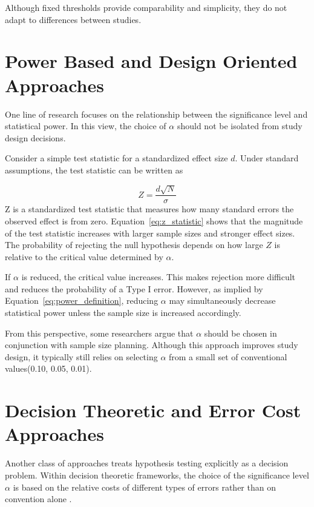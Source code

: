 Although fixed thresholds provide comparability and simplicity, they do not adapt to differences between studies.


\section{Power Based and Design Oriented Approaches}

One line of research focuses on the relationship between the significance level and statistical power. In this view, the choice of $\alpha$ should not be isolated from study design decisions.

Consider a simple test statistic for a standardized effect size $d$. Under standard assumptions, the test statistic can be written as

\begin{equation}
	Z = \frac{d \sqrt{N}}{\sigma}
	\label{eq:z_statistic}
\end{equation}
Z is a standardized test statistic that measures how many standard errors the observed effect is from zero.
Equation~\ref{eq:z_statistic} shows that the magnitude of the test statistic increases with larger sample sizes and stronger effect sizes. The probability of rejecting the null hypothesis depends on how large $Z$ is relative to the critical value determined by $\alpha$\cite{PetersonFoley2021}.

If $\alpha$ is reduced, the critical value increases. This makes rejection more difficult and reduces the probability of a Type I error. However, as implied by Equation~\ref{eq:power_definition}, reducing $\alpha$ may simultaneously decrease statistical power unless the sample size is increased accordingly.

From this perspective, some researchers argue that $\alpha$ should be chosen in conjunction with sample size planning. Although this approach improves study design, it typically still relies on selecting $\alpha$ from a small set of conventional values(0.10, 0.05, 0.01)\cite{maier2022}.


\section{Decision Theoretic and Error Cost Approaches}

Another class of approaches treats hypothesis testing explicitly as a decision problem. 
Within decision theoretic frameworks, the choice of the significance level $\alpha$ 
is based on the relative costs of different types of errors rather than on convention 
alone \cite{Berger1985}.


